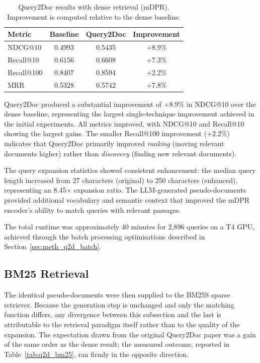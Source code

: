 \begin{table}[htbp]
    \centering
    \caption[Query2Doc results with dense retrieval]{Query2Doc results with dense retrieval (mDPR). Improvement is computed relative to the dense baseline.}
    \label{tab:q2d_dense}
    \begin{tabular}{@{}lccc@{}}
        \toprule
        \textbf{Metric} & \textbf{Baseline} & \textbf{Query2Doc} & \textbf{Improvement} \\
        \midrule
        NDCG@10 & 0.4993 & 0.5435 & +8.9\% \\
        Recall@10 & 0.6156 & 0.6608 & +7.3\% \\
        Recall@100 & 0.8407 & 0.8594 & +2.2\% \\
        MRR & 0.5328 & 0.5742 & +7.8\% \\
        \bottomrule
    \end{tabular}
\end{table}

Query2Doc produced a substantial improvement of +8.9\% in NDCG@10 over the dense baseline, representing the largest single-technique improvement achieved in the initial experiments. All metrics improved, with NDCG@10 and Recall@10 showing the largest gains. The smaller Recall@100 improvement (+2.2\%) indicates that Query2Doc primarily improved \emph{ranking} (moving relevant documents higher) rather than \emph{discovery} (finding new relevant documents).

The query expansion statistics showed consistent enhancement: the median query length increased from 27 characters (original) to 250 characters (enhanced), representing an 8.45$\times$ expansion ratio. The LLM-generated pseudo-documents provided additional vocabulary and semantic context that improved the mDPR encoder's ability to match queries with relevant passages.

The total runtime was approximately 40 minutes for 2,896 queries on a T4 GPU, achieved through the batch processing optimisations described in Section~\ref{sec:meth_q2d_batch}.

\subsection{BM25 Retrieval}
\label{sec:res_q2d_bm25}

The identical pseudo-documents were then supplied to the BM25S sparse retriever. Because the generation step is unchanged and only the matching function differs, any divergence between this subsection and the last is attributable to the retrieval paradigm itself rather than to the quality of the expansion. The expectation drawn from the original Query2Doc paper was a gain of the same order as the dense result; the measured outcome, reported in Table~\ref{tab:q2d_bm25}, ran firmly in the opposite direction.

